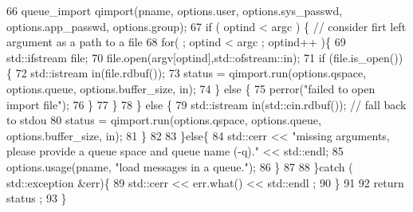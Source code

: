 \begin{DoxyCodeInclude}
66       queue\_import qimport(pname, options.user, options.sys\_passwd, options.app\_passwd, options.group);
67       if ( optind < argc ) \{ // consider firt left argument as a path to a file
68         for( ; optind < argc ; optind++ )\{
69           std::ifstream file;
70           file.open(argv[optind],std::ofstream::in);
71           if (file.is\_open())\{
72             std::istream in(file.rdbuf());
73             status = qimport.run(options.qspace, options.queue, options.buffer\_size, in);
74           \} else \{
75             perror("failed to open import file");
76           \}
77         \}
78       \} else \{
79         std::istream in(std::cin.rdbuf()); // fall back to stdou
80         status = qimport.run(options.qspace, options.queue, options.buffer\_size, in);
81       \}
82 
83     \}else\{
84       std::cerr << "missing arguments, please provide a queue space and queue name (-q)." << std::endl;
85       options.usage(pname, "load messages in a queue.");
86     \}
87 
88   \}catch ( std::exception &err)\{
89     std::cerr << err.what() << std::endl ;
90   \}
91 
92   return status ;
93 \}
\end{DoxyCodeInclude}
 